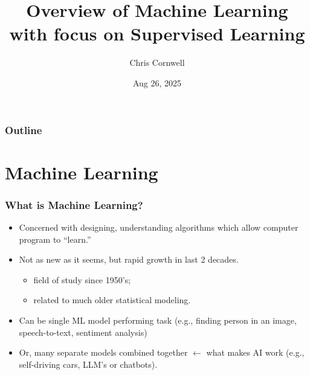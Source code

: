 \documentclass{beamer}
\author{Chris Cornwell}
\date{Aug 26, 2025}
\title{Overview of Machine Learning \newline 
    \footnotesize{with focus on Supervised Learning}}
\theoremstyle{example}
\begin{document}
\begin{frame}
\titlepage
\end{frame}

\begin{frame}
\frametitle{Outline}
\tableofcontents
\end{frame}

\section{Machine Learning}

\begin{frame}
\frametitle{What is Machine Learning?}
    \begin{itemize}
        \item Concerned with designing, understanding algorithms which allow computer program to ``learn.''
        \pause
        \item Not as new as it seems, but rapid growth in last 2 decades. 
        \begin{itemize}
            \item field of study since 1950's; 
            \item related to much older statistical modeling.
        \end{itemize}
        \pause
        \item Can be single ML model performing task (e.g., finding person in an image, speech-to-text, sentiment analysis)
        \pause
        \item Or, many separate models combined together $\leftarrow$ what makes AI work (e.g., self-driving cars, LLM's or chatbots).
    \end{itemize}
\end{frame}
\end{document}
